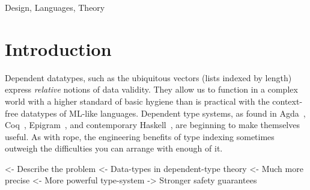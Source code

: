 \documentclass[authoryear]{sigplanconf}
\newenvironment{wstructure}{\comment}{\endcomment}
\begin{document}
\terms
Design, Languages, Theory




\section{Introduction}

Dependent datatypes, such as the ubiquitous vectors (lists indexed by
length) express \emph{relative} notions of data validity. They allow
us to function in a complex world with a higher standard of basic
hygiene than is practical with the context-free datatypes of ML-like
languages. Dependent type systems, as found in
Agda~\cite{norell:agda}, Coq~\cite{coq},
Epigram~\cite{mcbride.mckinna:view-from-the-left}, and contemporary
Haskell~\cite{cheney:gadt, xi:gadt}, are beginning to make themselves useful. As
with rope, the engineering benefits of type indexing sometimes
outweigh the difficulties you can arrange with enough of it.


\begin{wstructure}
<- Describe the problem
    <- Data-types in dependent-type theory
        <- Much more precise
            <- More powerful type-system
            -> Stronger safety guarantees
\end{wstructure}

\end{document}
